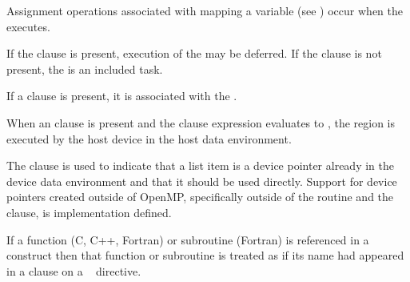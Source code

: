 Assignment operations associated with mapping a variable (see ) occur when the  executes.

If the  clause is present, execution of the  may be deferred.  If the  clause is not present, the  is an included task.

If a  clause is present, it is associated with the .

When an  clause is present and the  clause expression evaluates to , the  region is executed by the host device in the host data environment.

The  clause is used to indicate that a list item is a device
pointer already in the device data environment and that it should be used
directly.  Support for device pointers created outside of OpenMP, specifically
outside of the  routine and the  clause,
is implementation defined.

If a function (C, C++, Fortran) or subroutine (Fortran) is referenced in a
 construct then that function or subroutine is treated as if its
name had appeared in a  clause on a ~
directive.

